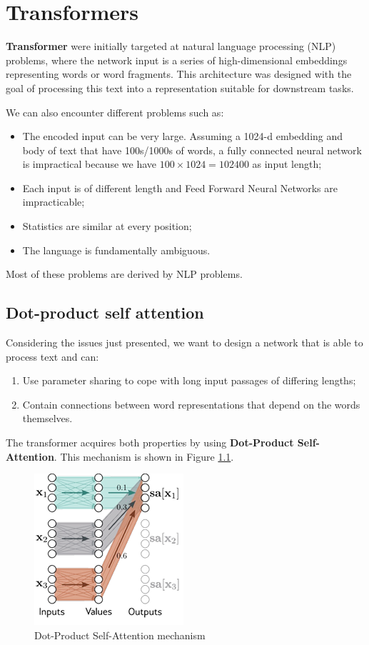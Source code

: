 \chapter{Transformers}
\textbf{Transformer} were initially targeted at natural language processing (NLP)
problems, where the network input is a series of high-dimensional embeddings
representing words or word fragments. This architecture was designed with the goal
of processing this text into a representation suitable for downstream tasks.

We can also encounter different problems such as:
\begin{itemize}
    \item The encoded input can be very large. Assuming a 1024-d embedding and
          body of text that have 100s/1000s of words, a fully connected neural
          network is impractical because we have $100 \times 1024 = 102400$ as
          input length;
    \item Each input is of different length and Feed Forward Neural Networks are
          impracticable;
    \item Statistics are similar at every position;
    \item The language is fundamentally ambiguous.
\end{itemize}

Most of these problems are derived by NLP problems.
\section{Dot-product self attention}
Considering the issues just presented, we want to design a network that is able
to process text and can:
\begin{enumerate}
    \item Use parameter sharing to cope with long input passages of differing
          lengths;
    \item Contain connections between word representations that depend on the
          words themselves.
\end{enumerate}
The transformer acquires both properties by using \textbf{Dot-Product Self-Attention}.
This mechanism is shown in Figure \ref{fig:sa}.

\begin{figure}[!ht]
    \centering
    \includegraphics[width=0.3\linewidth]{img/transformer/selfattention.png}
    \caption{Dot-Product Self-Attention mechanism}
    \label{fig:sa}
\end{figure}

